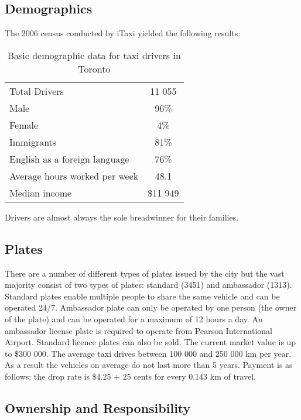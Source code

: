 \documentclass[11pt]{article}
\begin{document}
\subsection{Demographics}
The 2006 census conducted by iTaxi yielded the following results\cite{iTaxiWorkers2012}:
\begin{table}[h]
\centering
\caption{Basic demographic data for taxi drivers in Toronto}
\begin{tabular}{l c}
 Total Drivers & 11 055 \\
 Male & 96\% \\
 Female & 4\% \\
 Immigrants & 81\% \\
 English as a foreign language & 76\% \\
 Average hours worked per week & 48.1 \\
 Median income & \$11 949 \\
\end{tabular}
\end{table}

Drivers are almost always the sole breadwinner for their families\cite{Abdiphone}.

\subsection{Plates}
There are a number of different types of plates issued by the city but the vast majority 
consist of two types of plates: standard (3451) and ambassador (1313)\cite{thestat2012}. 
Standard plates enable multiple people to share the same vehicle and can be operated 24/7. 
Ambassador plate can only be operated by one person (the owner of the plate) and can be 
operated for a maximum of 12 hours a day. An ambassador license plate is required to 
operate from Pearson International Airport. Standard licence plates can also be sold. 
The current market value is up to \$300 000\cite{thestar2012}. The average taxi drives between 100 000 and 
250 000 km per year\cite{thestar2012}. As a result the vehicles on average do not last more than 5 
years\cite{thestar}. Payment is as follows: the drop rate is \$4.25 + 25 cents for every 0.143 km of 
travel\cite{thestar2012}.

\subsection{Ownership and Responsibility}
\end{document}
